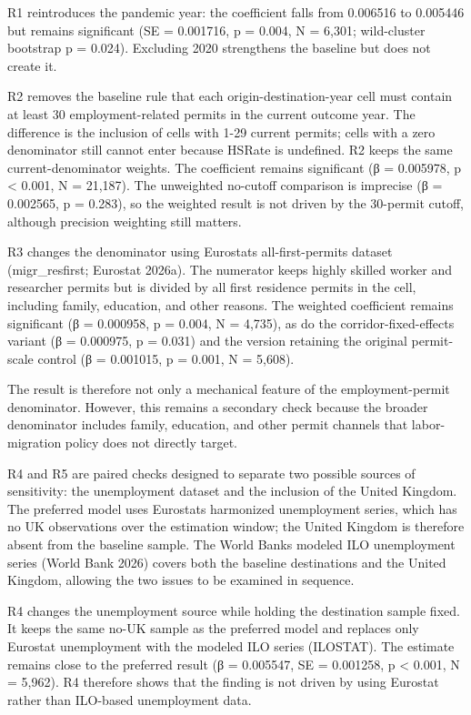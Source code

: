 \documentclass[11pt,a4paper]{article}
\begin{document}
R1 reintroduces the pandemic year: the coefficient falls from 0.006516
to 0.005446 but remains significant (SE = 0.001716, p = 0.004, N =
6,301; wild-cluster bootstrap p = 0.024). Excluding 2020 strengthens the
baseline but does not create it.

R2 removes the baseline rule that each origin-destination-year cell must
contain at least 30 employment-related permits in the current outcome
year. The difference is the inclusion of cells with 1-29 current
permits; cells with a zero denominator still cannot enter because HSRate
is undefined. R2 keeps the same current-denominator weights. The
coefficient remains significant (β = 0.005978, p \textless{} 0.001, N =
21,187). The unweighted no-cutoff comparison is imprecise (β = 0.002565,
p = 0.283), so the weighted result is not driven by the 30-permit
cutoff, although precision weighting still matters.

R3 changes the denominator using Eurostat\textquotesingle s
all-first-permits dataset (migr\_resfirst; Eurostat 2026a). The
numerator keeps highly skilled worker and researcher permits but is
divided by all first residence permits in the cell, including family,
education, and other reasons. The weighted coefficient remains
significant (β = 0.000958, p = 0.004, N = 4,735), as do the
corridor-fixed-effects variant (β = 0.000975, p = 0.031) and the version
retaining the original permit-scale control (β = 0.001015, p = 0.001, N
= 5,608).

The result is therefore not only a mechanical feature of the
employment-permit denominator. However, this remains a secondary check
because the broader denominator includes family, education, and other
permit channels that labor-migration policy does not directly target.

R4 and R5 are paired checks designed to separate two possible sources of
sensitivity: the unemployment dataset and the inclusion of the United
Kingdom. The preferred model uses Eurostat\textquotesingle s harmonized
unemployment series, which has no UK observations over the estimation
window; the United Kingdom is therefore absent from the baseline sample.
The World Bank\textquotesingle s modeled ILO unemployment series (World
Bank 2026) covers both the baseline destinations and the United Kingdom,
allowing the two issues to be examined in sequence.

R4 changes the unemployment source while holding the destination sample
fixed. It keeps the same no-UK sample as the preferred model and
replaces only Eurostat unemployment with the modeled ILO series
(ILOSTAT). The estimate remains close to the preferred result (β =
0.005547, SE = 0.001258, p \textless{} 0.001, N = 5,962). R4 therefore
shows that the finding is not driven by using Eurostat rather than
ILO-based unemployment data.
\end{document}
